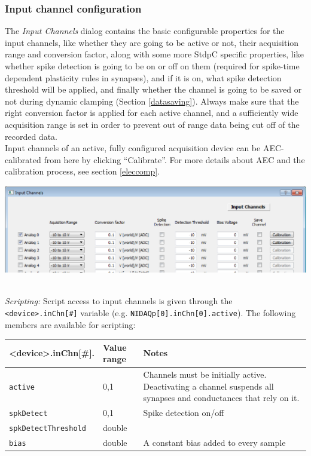 \documentclass{article}
\begin{document}
\subsubsection{Input channel configuration} \label{inchnconfig}

The \emph{Input Channels} dialog contains the basic configurable properties
for the input channels, like whether they are going to be active or not,
their acquisition range and conversion factor, along with some more StdpC specific
properties, like whether spike detection is going to be on or
off on them (required for spike-time dependent plasticity rules in synapses), and if it is on, what spike
detection threshold will be applied, and finally whether the channel is
going to be saved or not during dynamic clamping (Section \ref{datasaving}). Always make sure that the
right conversion factor is applied for each active channel, and a
sufficiently wide acquisition range is set in order to prevent out of range
data being cut off of the recorded data. \\
Input channels of an active, fully configured acquisition device can be AEC-calibrated from here by
clicking ``Calibrate''. For more details about AEC and the calibration process, see section \ref{eleccomp}.\\

\noindent
\parbox{\textwidth}{
	\includegraphics[scale=0.5]{inputChnDialog}
} \\[0.2cm]

\noindent
\emph{Scripting:} Script access to input channels is given through the \texttt{<device>.inChn[\#]} variable
(e.g. \texttt{NIDAQp[0].inChn[0].active}).
The following members are available for scripting: \\
\begin{tabularx}{\linewidth}{|ll|X|}
	\hline
	{\bf \textless{}device\textgreater.inChn[\#].\textvisiblespace} & {\bf Value range} & {\bf Notes} \\
	\hline
	\texttt{active} & 0,1 & Channels must be initially active. Deactivating a channel suspends all
	  synapses and conductances that rely on it. \\
	\texttt{spkDetect} & 0,1 & Spike detection on/off \\
	\texttt{spkDetectThreshold} & double & \\
	\texttt{bias} & double & A constant bias added to every sample \\
	\hline
\end{tabularx}
\end{document}
